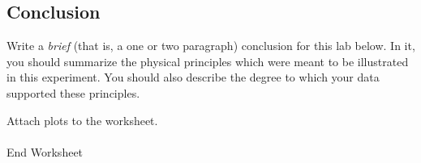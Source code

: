 \subsection{Conclusion}

Write a {\it brief} (that is, a one or two paragraph) conclusion for
this lab below. In it, you should summarize the physical
principles which were meant to be illustrated in this experiment. You
should also describe the degree to which your data supported these
principles.

\vfill
\noindent Attach plots to the worksheet. \\
\ \\
{\Large End Worksheet} 
\renewcommand{\thesection}{\thechapter.\arabic{section}}














